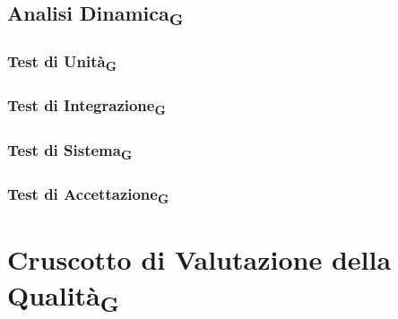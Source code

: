 \documentclass[11pt,a4paper]{article}
\begin{document}
\newpage
\subsection{Analisi Dinamica\textsubscript{G}}
\subsubsection{Test di Unità\textsubscript{G}}

\subsubsection{Test di Integrazione\textsubscript{G}}

\subsubsection{Test di Sistema\textsubscript{G}}

\subsubsection{Test di Accettazione\textsubscript{G}}



\newpage
\section{Cruscotto di Valutazione della Qualità\textsubscript{G}}
\end{document}
